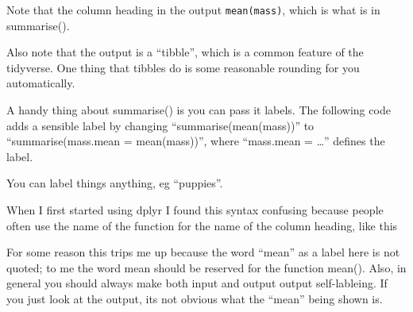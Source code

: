 \documentclass[]{book}
\newenvironment{Shaded}{\begin{snugshade}}{\end{snugshade}}
\newcommand{\KeywordTok}[1]{\textcolor[rgb]{0.13,0.29,0.53}{\textbf{#1}}}
\newcommand{\DataTypeTok}[1]{\textcolor[rgb]{0.13,0.29,0.53}{#1}}
\newcommand{\StringTok}[1]{\textcolor[rgb]{0.31,0.60,0.02}{#1}}
\newcommand{\OperatorTok}[1]{\textcolor[rgb]{0.81,0.36,0.00}{\textbf{#1}}}
\newcommand{\NormalTok}[1]{#1}
\theoremstyle{definition}
\theoremstyle{definition}
\theoremstyle{definition}
\theoremstyle{remark}
\begin{document}
Note that the column heading in the output \texttt{mean(mass)}, which is
what is in summarise().

Also note that the output is a ``tibble'', which is a common feature of
the tidyverse. One thing that tibbles do is some reasonable rounding for
you automatically.

A handy thing about summarise() is you can pass it labels. The following
code adds a sensible label by changing ``summarise(mean(mass))'' to
``summarise(mass.mean = mean(mass))'', where ``mass.mean = \ldots{}''
defines the label.

\begin{Shaded}
\end{Shaded}

You can label things anything, eg ``puppies''.

\begin{Shaded}
\end{Shaded}

When I first started using dplyr I found this syntax confusing because
people often use the name of the function for the name of the column
heading, like this

\begin{Shaded}
\end{Shaded}

For some reason this trips me up because the word ``mean'' as a label
here is not quoted; to me the word mean should be reserved for the
function mean(). Also, in general you should always make both input and
output output self-lableing. If you just look at the output, its not
obvious what the ``mean'' being shown is.
\end{document}
